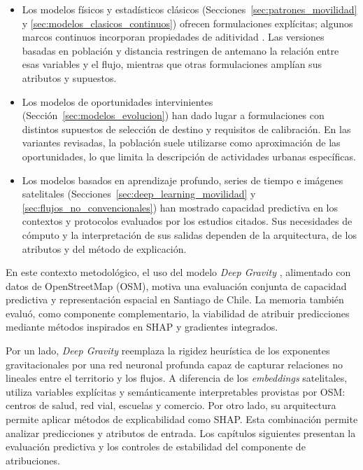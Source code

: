 \begin{itemize}
    \item Los modelos físicos y estadísticos clásicos (Secciones~\ref{sec:patrones_movilidad} y \ref{sec:modelos_clasicos_continuos}) ofrecen formulaciones explícitas; algunos marcos continuos incorporan propiedades de aditividad \cite{simini2013human}. Las versiones basadas en población y distancia restringen de antemano la relación entre esas variables y el flujo, mientras que otras formulaciones amplían sus atributos y supuestos.
    \item Los modelos de oportunidades intervinientes (Sección~\ref{sec:modelos_evolucion}) han dado lugar a formulaciones con distintos supuestos de selección de destino y requisitos de calibración. En las variantes revisadas, la población suele utilizarse como aproximación de las oportunidades, lo que limita la descripción de actividades urbanas específicas.
    \item Los modelos basados en aprendizaje profundo, series de tiempo e imágenes satelitales (Secciones~\ref{sec:deep_learning_movilidad} y \ref{sec:flujos_no_convencionales}) han mostrado capacidad predictiva en los contextos y protocolos evaluados por los estudios citados. Sus necesidades de cómputo y la interpretación de sus salidas dependen de la arquitectura, de los atributos y del método de explicación.
\end{itemize}

En este contexto metodológico, el uso del modelo \textit{Deep Gravity} \cite{simini2021deep}, alimentado con datos de OpenStreetMap (OSM), motiva una evaluación conjunta de capacidad predictiva y representación espacial en Santiago de Chile. La memoria también evaluó, como componente complementario, la viabilidad de atribuir predicciones mediante métodos inspirados en SHAP \cite{lundberg2017shap} y gradientes integrados.

Por un lado, \textit{Deep Gravity} reemplaza la rigidez heurística de los exponentes gravitacionales por una red neuronal profunda capaz de capturar relaciones no lineales entre el territorio y los flujos. A diferencia de los \textit{embeddings} satelitales, utiliza variables explícitas y semánticamente interpretables provistas por OSM: centros de salud, red vial, escuelas y comercio. Por otro lado, su arquitectura permite aplicar métodos de explicabilidad como SHAP. Esta combinación permite analizar predicciones y atributos de entrada. Los capítulos siguientes presentan la evaluación predictiva y los controles de estabilidad del componente de atribuciones.
